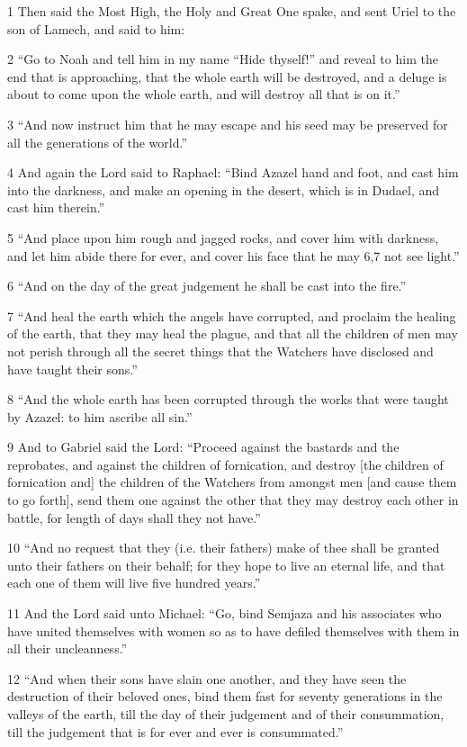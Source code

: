 \par 1 Then said the Most High, the Holy and Great One spake, and sent Uriel to the son of Lamech, and said to him:
\par 2 “Go to Noah and tell him in my name “Hide thyself!” and reveal to him the end that is approaching, that the whole earth will be destroyed, and a deluge is about to come upon the whole earth, and will destroy all that is on it.”
\par 3 “And now instruct him that he may escape and his seed may be preserved for all the generations of the world.”
\par 4 And again the Lord said to Raphael: “Bind Azazel hand and foot, and cast him into the darkness, and make an opening in the desert, which is in Dudael, and cast him therein.”
\par 5 “And place upon him rough and jagged rocks, and cover him with darkness, and let him abide there for ever, and cover his face that he may 6,7 not see light.”
\par 6 “And on the day of the great judgement he shall be cast into the fire.” 
\par 7 “And heal the earth which the angels have corrupted, and proclaim the healing of the earth, that they may heal the plague, and that all the children of men may not perish through all the secret things that the Watchers have disclosed and have taught their sons.”
\par 8 “And the whole earth has been corrupted through the works that were taught by Azazel: to him ascribe all sin.”
\par 9 And to Gabriel said the Lord: “Proceed against the bastards and the reprobates, and against the children of fornication, and destroy [the children of fornication and] the children of the Watchers from amongst men [and cause them to go forth], send them one against the other that they may destroy each other in battle, for length of days shall they not have.”
\par 10 “And no request that they (i.e. their fathers) make of thee shall be granted unto their fathers on their behalf; for they hope to live an eternal life, and that each one of them will live five hundred years.”
\par 11 And the Lord said unto Michael: “Go, bind Semjaza and his associates who have united themselves with women so as to have defiled themselves with them in all their uncleanness.”
\par 12 “And when their sons have slain one another, and they have seen the destruction of their beloved ones, bind them fast for seventy generations in the valleys of the earth, till the day of their judgement and of their consummation, till the judgement that is for ever and ever is consummated.”
